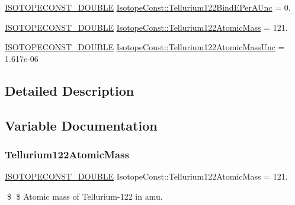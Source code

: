 \begin{DoxyCompactItemize}
\mbox{\hyperlink{group___isotope_const-_macros_ga8f45a7272ce02c0b4c65c44636ed719a}{I\+S\+O\+T\+O\+P\+E\+C\+O\+N\+S\+T\+\_\+\+D\+O\+U\+B\+LE}} \mbox{\hyperlink{group___isotope_const-_tellurium-_te122_ga72f835d72f3a542740a3b2089c831de9}{Isotope\+Const\+::\+Tellurium122\+Bind\+E\+Per\+A\+Unc}} = 0.
\item 
\mbox{\hyperlink{group___isotope_const-_macros_ga8f45a7272ce02c0b4c65c44636ed719a}{I\+S\+O\+T\+O\+P\+E\+C\+O\+N\+S\+T\+\_\+\+D\+O\+U\+B\+LE}} \mbox{\hyperlink{group___isotope_const-_tellurium-_te122_gad42e11bb58cdba808e26e8f984943506}{Isotope\+Const\+::\+Tellurium122\+Atomic\+Mass}} = 121.
\item 
\mbox{\hyperlink{group___isotope_const-_macros_ga8f45a7272ce02c0b4c65c44636ed719a}{I\+S\+O\+T\+O\+P\+E\+C\+O\+N\+S\+T\+\_\+\+D\+O\+U\+B\+LE}} \mbox{\hyperlink{group___isotope_const-_tellurium-_te122_gabfbf92c3d0dae9645eb6dc5cefd4a09d}{Isotope\+Const\+::\+Tellurium122\+Atomic\+Mass\+Unc}} = 1.\+617e-\/06
\end{DoxyCompactItemize}


\subsection{Detailed Description}


\subsection{Variable Documentation}
\mbox{\label{group___isotope_const-_tellurium-_te122_gad42e11bb58cdba808e26e8f984943506}} 
\subsubsection{\texorpdfstring{Tellurium122\+Atomic\+Mass}{Tellurium122AtomicMass}}
{\footnotesize\ttfamily \mbox{\hyperlink{group___isotope_const-_macros_ga8f45a7272ce02c0b4c65c44636ed719a}{I\+S\+O\+T\+O\+P\+E\+C\+O\+N\+S\+T\+\_\+\+D\+O\+U\+B\+LE}} Isotope\+Const\+::\+Tellurium122\+Atomic\+Mass = 121.}

\$ \$ Atomic mass of Tellurium-\/122 in amu. \mbox{\label{group___isotope_const-_tellurium-_te122_gabfbf92c3d0dae9645eb6dc5cefd4a09d}} 
